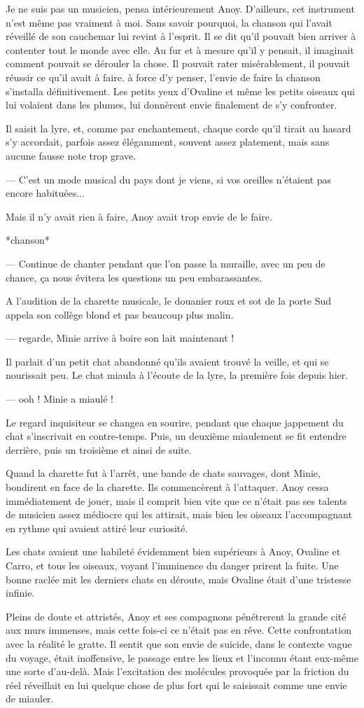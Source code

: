 Je ne suis pas un musicien, pensa intérieurement Anoy. D'ailleurs, cet
instrument n'est même pas vraiment à moi. Sans savoir pourquoi, la
chanson qui l'avait réveillé de son cauchemar lui revint à
l'esprit. Il se dit qu'il pouvait bien arriver à contenter tout le
monde avec elle. Au fur et à mesure qu'il y pensait, il imaginait
comment pouvait se dérouler la chose. Il pouvait rater misérablement,
il pouvait réussir ce qu'il avait à faire. à force d'y penser, l'envie
de faire la chanson s'installa définitivement. Les petits yeux
d'Ovaline et même les petits oiseaux qui lui volaient dans les plumes,
lui donnèrent envie finalement de s'y confronter.

Il saisit la lyre, et, comme par enchantement, chaque corde qu'il tirait au
hasard s'y accordait, parfois assez élégamment, souvent assez
platement, mais sans aucune fausse note trop grave.

--- C'est un mode musical du pays dont je viens, si vos oreilles
n'étaient pas encore habituées...

Mais il n'y avait rien à faire, Anoy avait trop envie de le faire.

*chanson*


--- Continue de chanter pendant que l'on passe la muraille, avec un peu
de chance, ça nous évitera les questions un peu embarassantes.

A l'audition de la charette musicale, le douanier roux et sot de la
porte Sud appela son collège blond et pas beaucoup plus malin.

--- regarde, Minie arrive à boire son lait maintenant ! 

Il parlait d'un petit chat abandonné qu'ils avaient trouvé la veille,
et qui se nourissait peu. Le chat miaula à l'écoute de la lyre, la
première fois depuis hier.

--- ooh ! Minie a miaulé !

Le regard inquisiteur se changea en sourire, pendant que chaque
jappement du chat s'inscrivait en contre-temps. Puis, un deuxième
miaulement se fit entendre derrière, puis un troisième et ainsi de
suite. 

Quand la charette fut à l'arrêt, une bande de chats sauvages, dont
Minie, bondirent en face de la charette. Ils commencèrent à
l'attaquer. Anoy cessa immédiatement de jouer, mais il comprit bien
vite que ce n'était pas ses talents de musicien assez médiocre qui les
attirait, mais bien les oiseaux l'accompagnant en rythme qui avaient
attiré leur curiosité.

Les chats avaient une habileté
évidemment bien supérieurs à Anoy, Ovaline et Carro, et tous les
oiseaux, voyant l'imminence du danger prirent la fuite. Une bonne
raclée mit les derniers chats en déroute, mais Ovaline était d'une
tristesse infinie.

Pleins de doute et attristés, Anoy et ses compagnons pénétrerent la
grande cité aux murs immenses, mais cette fois-ci ce n'était pas en
rêve. Cette confrontation avec la réalité le gratte. Il sentit que son
envie de suicide, dans le contexte vague du voyage, était inoffensive,
le passage entre les lieux et l'inconnu étant eux-même une sorte
d'au-delà. Mais l'excitation des molécules provoquée par la friction
du réel réveillait en lui quelque chose de plus fort qui le saisissait
comme une envie de miauler.
